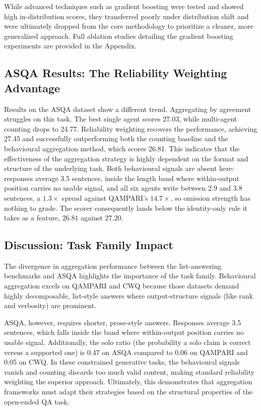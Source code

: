 \documentclass{article}
\begin{document}
While advanced techniques such as gradient boosting were tested and showed high in-distribution scores, they transferred poorly under distribution shift and were ultimately dropped from the core methodology to prioritize a cleaner, more generalized approach. Full ablation studies detailing the gradient boosting experiments are provided in the Appendix.

\subsection{ASQA Results: The Reliability Weighting Advantage}
\label{sec:rq3}


Results on the ASQA dataset show a different trend. Aggregating by agreement struggles on this task. The best single agent scores 27.03, while multi-agent counting drops to 24.77. Reliability weighting recovers the performance, achieving 27.45 and successfully outperforming both the counting baseline and the behavioural aggregation method, which scores 26.81. This indicates that the effectiveness of the aggregation strategy is highly dependent on the format and structure of the underlying task. Both behavioural signals are absent here: responses average 3.5 sentences, inside the length band where within-output position carries no usable signal, and all six agents write between 2.9 and 3.8 sentences, a $1.3\times$ spread against QAMPARI's $14.7\times$, so omission strength has nothing to grade. The scorer consequently lands below the identity-only rule it takes as a feature, $26.81$ against $27.20$.

\subsection{Discussion: Task Family Impact}

The divergence in aggregation performance between the list-answering benchmarks and ASQA highlights the importance of the task family. Behavioural aggregation excels on QAMPARI and CWQ because those datasets demand highly decomposable, list-style answers where output-structure signals (like rank and verbosity) are prominent.

ASQA, however, requires shorter, prose-style answers. Responses average 3.5 sentences, which falls inside the band where within-output position carries no usable signal. Additionally, the solo ratio (the probability a solo claim is correct versus a supported one) is 0.47 on ASQA compared to 0.06 on QAMPARI and 0.05 on CWQ. In these constrained generative tasks, the behavioural signals vanish and counting discards too much valid content, making standard reliability weighting the superior approach. Ultimately, this demonstrates that aggregation frameworks must adapt their strategies based on the structural properties of the open-ended QA task.
\end{document}
